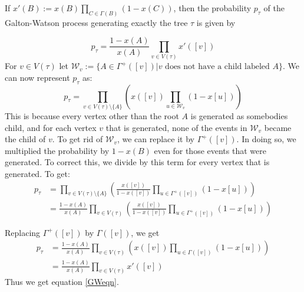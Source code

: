 \begin{theorem}
\label{GW}
 If $x'(B) := x(B)\prod_{C\in\Gamma(B) }(1-x(C)) $, then the probability $p_\tau$ of the Galton-Watson process generating exactly the tree $\tau$ is given by
\end{theorem}
\begin{equation}
 \label{GWeqn}
 p_\tau  = \frac{1-x(A)}{x(A) }\prod\limits_{v\in V(\tau) }x'([v])
\end{equation}
\proof For $v\in V(\tau) $ let $\mathcal{W}_v := \{A\in\Gamma^+([v])|v \text{ does not have a child labeled }A \} $. We can now represent $p_\tau$ as:
\[
p_\tau = \prod\limits_{v\in V(\tau)\setminus \{A\} } \left(x([v])\prod\limits_{u\in \mathcal{W}_v }\left(1-x[u]\right) \right)
\]
This is because every vertex other than the root $A$ is generated as somebodies child, and for each vertex $v$ that is generated, none of the events in $\mathcal{W}_v $ became the child of $v$. To get rid of $\mathcal{W}_v $, we can replace it by $\Gamma^+([v])$. In doing so, we multiplied the probability by $1-x(B)$ even for those events that were generated. To correct this, we divide by this term for every vertex that is generated. To get:
\begin{equation*}
\begin{align}
  p_\tau & = \prod\limits_{v\in V(\tau)\setminus \{A\} } \left(\frac{x([v])}{1-x([v])} \prod\limits_{u\in \Gamma^+([v]) }\left(1-x[u]\right) \right) \\
  & = \frac{1-x(A) }{x(A) } \prod\limits_{v\in V(\tau) } \left(\frac{x([v])}{1-x([v])} \prod\limits_{u\in \Gamma^+([v]) }\left(1-x[u]\right) \right)
\end{align}
\end{equation*}


Replacing $\Gamma^+([v]) $ by $\Gamma([v]) $, we get
\begin{equation*}
\begin{align}
 p_\tau & = \frac{1-x(A) }{x(A) } \prod\limits_{v\in V(\tau) } \left({x([v])} \prod\limits_{u\in \Gamma([v]) }\left(1-x[u]\right) \right) \\
 & = \frac{1-x(A) }{x(A)} \prod\limits_{v\in V(\tau) } x'([v])
\end{align} 
\end{equation*}
Thus we get equation \ref{GWeqn}.

